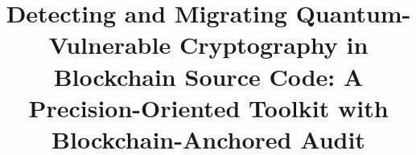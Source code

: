 \documentclass[runningheads]{llncs}
\begin{document}
\title{Detecting and Migrating Quantum-Vulnerable Cryptography in Blockchain
Source Code: A Precision-Oriented Toolkit with Blockchain-Anchored Audit}


%
%
%
%
%
%
%
%
\end{document}
